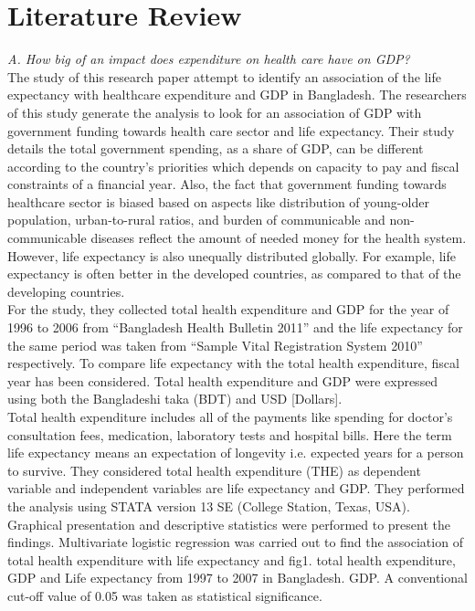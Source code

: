 \documentclass[conference]{IEEEtran}
\begin{document}
\section{Literature Review}
\emph{A. How big of an impact does expenditure on health care have on GDP?}
\\The study of this research paper attempt to identify an association of the life expectancy with healthcare expenditure and GDP in Bangladesh. The researchers of this study generate the analysis to look for an association of GDP with government funding towards health care sector and life expectancy. Their study details the total government spending, as a share of GDP, can be different according to the country's priorities which depends on capacity to pay and fiscal constraints of a financial year. Also, the fact that government funding towards healthcare sector is biased based on aspects like distribution of young-older population, urban-to-rural ratios, and burden of communicable and non-communicable diseases reflect the amount of needed money for the health system. However, life expectancy is also unequally distributed globally. For example, life expectancy is often better in the developed countries, as compared to that of the developing countries.
\\For the study, they collected total health expenditure and GDP for the year of 1996 to 2006 from “Bangladesh Health Bulletin 2011” and the life expectancy for the same period was taken from “Sample Vital Registration System 2010” respectively. To compare life expectancy with the total health expenditure, fiscal year has been considered. Total health expenditure and GDP were expressed using both the Bangladeshi taka (BDT) and USD [Dollars].
\\Total health expenditure includes all of the payments like spending for doctor's consultation fees, medication, laboratory tests and hospital bills. Here the term life expectancy means an expectation of longevity i.e. expected years for a person to survive. They considered total health expenditure (THE) as dependent variable and independent variables are life expectancy and GDP. They performed the analysis using STATA version 13 SE (College Station, Texas, USA). Graphical presentation and descriptive statistics were performed to present the findings. Multivariate logistic regression was carried out to find the association of total health expenditure with life expectancy and fig1. total health expenditure, GDP and Life expectancy from 1997 to 2007 in Bangladesh. GDP. A conventional cut-off value of 0.05 was taken as statistical significance.
\end{document}
